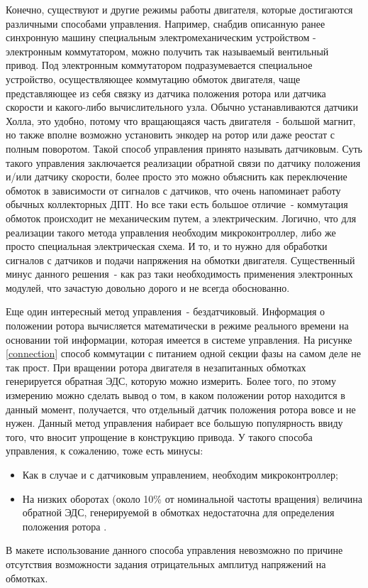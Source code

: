 Конечно, существуют и другие режимы работы двигателя, которые достигаются 
различными способами управления. Например, снабдив описанную ранее синхронную
машину специальным электромеханическим устройством - электронным коммутатором, 
можно получить так называемый вентильный привод. Под электронным коммутатором
подразумевается специальное устройство, осуществляющее коммутацию обмоток двигателя, 
чаще представляющее из себя связку
из датчика положения ротора или датчика скорости и какого-либо вычислительного узла. Обычно устанавливаются 
датчики Холла, это удобно, потому что вращающаяся часть двигателя~- большой магнит, но также
вполне возможно установить энкодер на ротор или даже реостат с полным поворотом. 
Такой способ управления принято называть датчиковым. Суть такого управления 
заключается реализации обратной связи по датчику положения и/или датчику скорости, более просто 
это можно объяснить как переключение обмоток в зависимости от сигналов с датчиков, что очень напоминает работу 
обычных коллекторных ДПТ. Но все таки есть
большое отличие~- коммутация обмоток происходит не механическим путем, а электрическим.
Логично, что для реализации такого метода управления необходим микроконтроллер, либо же просто
специальная электрическая схема. И то, и то нужно для
обработки сигналов с датчиков и подачи напряжения на обмотки двигателя.
Существенный минус данного решения~- как раз таки необходимость
применения электронных модулей, что зачастую довольно дорого и не всегда обоснованно. 

Еще один интересный метод управления~- бездатчиковый. Информация о положении ротора 
вычисляется математически в режиме реального времени на основании той 
информации, которая имеется в системе управления. На рисунке \ref{connection} способ коммутации
с питанием одной секции фазы на самом деле не так прост. При вращении ротора двигателя в 
незапитанных обмотках генерируется обратная ЭДС, которую можно измерить. 
Более того, по этому измерению можно сделать вывод о том, в каком положении ротор 
находится в данный момент, получается, что отдельный датчик положения ротора вовсе и не нужен.
Данный метод управления набирает все большую популярность ввиду того, что вносит
упрощение в конструкцию привода.
У такого способа управления, к сожалению, тоже есть минусы:
\begin{itemize}
  \item Как в случае и с датчиковым управлением, необходим микроконтроллер;
  \item На низких оборотах (около 10\% от номинальной частоты вращения) величина обратной ЭДС,
генерируемой в обмотках недостаточна для определения положения ротора \cite{Инжреш}.
\end{itemize}
В макете использование данного способа управления невозможно по причине отсутствия возможности 
задания отрицательных амплитуд напряжений на обмотках.

